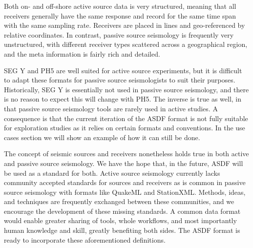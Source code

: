 Both on- and off-shore active source data is very structured, meaning that all
receivers generally have the same response and record for the same time span
with the same sampling rate.  Receivers are placed in lines and geo-referenced
by relative coordinates.  In contrast, passive source seismology is frequently
very unstructured, with different receiver types scattered across a
geographical region, and the meta information is fairly rich and detailed.

SEG Y and PH5 are well suited for active source experiments,
but it is difficult to adapt these formats for passive source seismologists to
suit their purposes.  Historically, SEG Y is essentially not used in
passive source seismology, and there is no reason to expect this will change
with PH5. The inverse is true as well, in that passive source
seismology tools are rarely used in active studies. A consequence is that the
current iteration of the ASDF format is not fully suitable for
exploration studies as it relies on certain formats and conventions. In the use
cases section we will show an example of how it can still be done.

The concept of seismic sources and receivers nonetheless holds true in both
active and passive source seismology. We have the hope that, in the future,
ASDF will be used as a standard for both. Active source
seismology currently lacks community accepted standards for sources and
receivers as is common in passive source seismology with formats like
QuakeML and StationXML.  Methods, ideas, and techniques are
frequently exchanged between these communities, and we encourage the
development of these missing standards.  A common data format would enable
greater sharing of tools, whole workflows, and most importantly human knowledge
and skill, greatly benefiting both sides.  The ASDF format is ready to
incorporate these aforementioned definitions.
